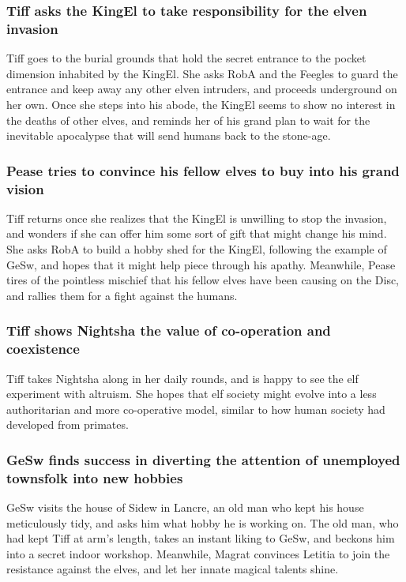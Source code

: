 \subsubsection{\Gls{Tiff} asks the \Gls{KingEl} to take responsibility for the elven invasion}
\Gls{Tiff} goes to the burial grounds that hold the secret entrance to the pocket dimension
inhabited by the \Gls{KingEl}. She asks \Gls{RobA} and the Feegles to guard the entrance and keep
away any other elven intruders, and proceeds underground on her own. Once she steps into his abode,
the \Gls{KingEl} seems to show no interest in the deaths of other elves, and reminds her of his
grand plan to wait for the inevitable apocalypse that will send humans back to the stone-age.

\subsubsection{\Gls{Pease} tries to convince his fellow elves to buy into his grand vision}
\Gls{Tiff} returns once she realizes that the \Gls{KingEl} is unwilling to stop the invasion, and
wonders if she can offer him some sort of gift that might change his mind. She asks \Gls{RobA} to
build a hobby shed for the \Gls{KingEl}, following the example of \Gls{GeSw}, and hopes that it
might help piece through his apathy. Meanwhile, \Gls{Pease} tires of the pointless mischief that
his fellow elves have been causing on the Disc, and rallies them for a fight against the humans.

\subsubsection{\Gls{Tiff} shows \Gls{Nightsha} the value of co-operation and coexistence}
\Gls{Tiff} takes \Gls{Nightsha} along in her daily rounds, and is happy to see the elf experiment
with altruism. She hopes that elf society might evolve into a less authoritarian and more
co-operative model, similar to how human society had developed from primates.

\subsubsection{\Gls{GeSw} finds success in diverting the attention of unemployed townsfolk into
    new hobbies}
\Gls{GeSw} visits the house of \Gls{Sidew} in Lancre, an old man who kept his house meticulously
tidy, and asks him what hobby he is working on. The old man, who had kept \Gls{Tiff} at arm's
length, takes an instant liking to \Gls{GeSw}, and beckons him into a secret indoor workshop.
Meanwhile, \Gls{Magrat} convinces \Gls{Letitia} to join the resistance against the elves, and let
her innate magical talents shine.

